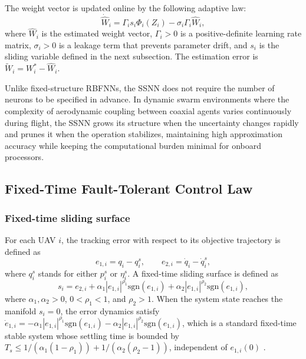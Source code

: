 The weight vector is updated online by the following adaptive law:
\begin{equation}
    \dot{\hat{W}}_i = \Gamma_i s_i \Phi_i(Z_i) - \sigma_i \Gamma_i \hat{W}_i,
    \label{eq:weight_law}
\end{equation}
where $\hat{W}_i$ is the estimated weight vector, $\Gamma_i > 0$ is a
positive-definite learning rate matrix, $\sigma_i > 0$ is a leakage term that
prevents parameter drift, and $s_i$ is the sliding variable defined in the
next subsection. The estimation error is $\tilde{W}_i = W_i^* - \hat{W}_i$.

\begin{remark}
Unlike fixed-structure RBFNNs, the SSNN does not require the number of neurons
to be specified in advance. In dynamic swarm environments where the complexity
of aerodynamic coupling between coaxial agents varies continuously during
flight, the SSNN grows its structure when the uncertainty changes rapidly and
prunes it when the operation stabilizes, maintaining high approximation accuracy
while keeping the computational burden minimal for onboard processors.
\end{remark}

\subsection{Fixed-Time Fault-Tolerant Control Law}
\label{sec5:control_law}

\subsubsection{Fixed-time sliding surface}

For each UAV $i$, the tracking error with respect to its objective trajectory
is defined as
\begin{equation}
    e_{1,i} = q_i - q_i^s, \qquad e_{2,i} = \dot{q}_i - \dot{q}_i^s,
    \label{eq:tracking_errors}
\end{equation}
where $q_i^s$ stands for either $p_i^s$ or $\eta_i^s$. A fixed-time sliding
surface is defined as
\begin{equation}
    s_i = e_{2,i} + \alpha_1 |e_{1,i}|^{\rho_1} \text{sgn}(e_{1,i})
        + \alpha_2 |e_{1,i}|^{\rho_2} \text{sgn}(e_{1,i}),
    \label{eq:sliding_surface}
\end{equation}
where $\alpha_1, \alpha_2 > 0$, $0 < \rho_1 < 1$, and $\rho_2 > 1$. When the
system state reaches the manifold $s_i = 0$, the error dynamics satisfy
$\dot{e}_{1,i} = -\alpha_1|e_{1,i}|^{\rho_1}\text{sgn}(e_{1,i})
-\alpha_2|e_{1,i}|^{\rho_2}\text{sgn}(e_{1,i})$, which is a standard fixed-time
stable system whose settling time is bounded by
$T_s \leq 1/(\alpha_1(1-\rho_1)) + 1/(\alpha_2(\rho_2-1))$, independent of
$e_{1,i}(0)$ \cite{Polyakov2012}.


